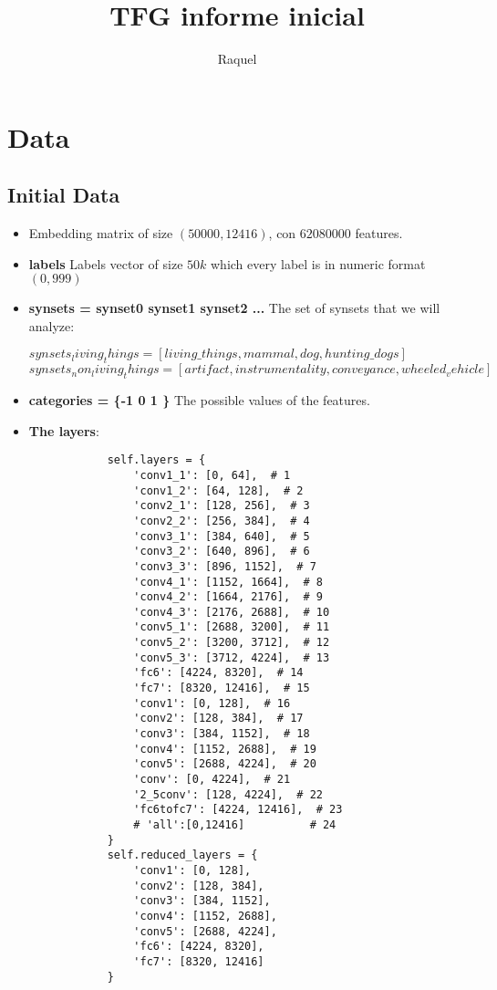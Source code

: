 \documentclass{article}
\title{TFG informe inicial}
\author{Raquel}
\begin{document}
\maketitle


\section{Data}
\subsection{Initial Data}
\begin{itemize}
	\item Embedding matrix of size $(50000, 12416)$, con $62080000$ features.
	\item \textbf{labels} Labels vector of size $50k$ which every label is in numeric format $(0,999)$
	\item \textbf{synsets = synset0 synset1 synset2 ...} The set of synsets that we will analyze: 
	      	      	      
	      $synsets_living_things = [living\_things, mammal, dog, hunting\_dogs]$
	      $synsets_non_living_things = [artifact, instrumentality, conveyance, wheeled_vehicle]$
	      	      	      
	\item \textbf{categories = \{-1 0 1 \}} The possible values of the features.
	\item \textbf{The layers}:
	      \begin{verbatim}
	      	self.layers = {
	      		'conv1_1': [0, 64],  # 1
	      		'conv1_2': [64, 128],  # 2
	      		'conv2_1': [128, 256],  # 3
	      		'conv2_2': [256, 384],  # 4
	      		'conv3_1': [384, 640],  # 5
	      		'conv3_2': [640, 896],  # 6
	      		'conv3_3': [896, 1152],  # 7
	      		'conv4_1': [1152, 1664],  # 8
	      		'conv4_2': [1664, 2176],  # 9
	      		'conv4_3': [2176, 2688],  # 10
	      		'conv5_1': [2688, 3200],  # 11
	      		'conv5_2': [3200, 3712],  # 12
	      		'conv5_3': [3712, 4224],  # 13
	      		'fc6': [4224, 8320],  # 14
	      		'fc7': [8320, 12416],  # 15
	      		'conv1': [0, 128],  # 16
	      		'conv2': [128, 384],  # 17
	      		'conv3': [384, 1152],  # 18
	      		'conv4': [1152, 2688],  # 19
	      		'conv5': [2688, 4224],  # 20
	      		'conv': [0, 4224],  # 21
	      		'2_5conv': [128, 4224],  # 22
	      		'fc6tofc7': [4224, 12416],  # 23
	      		# 'all':[0,12416]          # 24
	      	}
	      	self.reduced_layers = {
	      		'conv1': [0, 128],
	      		'conv2': [128, 384],
	      		'conv3': [384, 1152],
	      		'conv4': [1152, 2688],
	      		'conv5': [2688, 4224],
	      		'fc6': [4224, 8320],
	      		'fc7': [8320, 12416]
	      	}
	      \end{verbatim}
\end{itemize}
\end{document}
